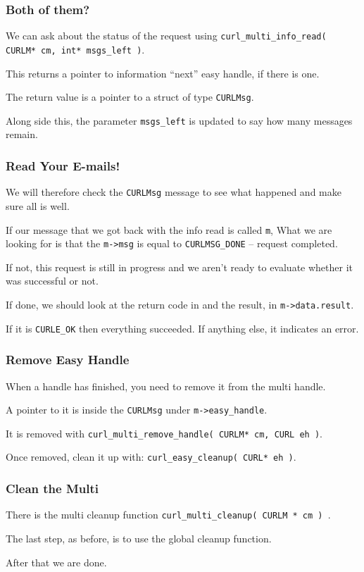 \begin{frame}
	\frametitle{Both of them?}
	We can ask about the status of the request using \texttt{curl\_multi\_info\_read( CURLM* cm, int* msgs\_left )}.

	This returns a pointer to information ``next'' easy handle, if there is one.

	The return value is a pointer to a struct of type \texttt{CURLMsg}.

	Along side this, the parameter \texttt{msgs\_left} is updated to say how many messages remain.

\end{frame}

\begin{frame}
	\frametitle{Read Your E-mails!}

	We will therefore check the \texttt{CURLMsg} message to see what happened and make sure all is well.

	If our message that we got back with the info read is called \texttt{m}, What we are looking for is that the \texttt{m->msg} is equal to \texttt{CURLMSG\_DONE} -- request completed.

	If not, this request is still in progress and we aren't ready to evaluate whether it was successful or not.

	If done, we should look at the return code in and the result, in \texttt{m->data.result}.

	If it is \texttt{CURLE\_OK} then everything succeeded. If anything else, it indicates an error.


\end{frame}

\begin{frame}
	\frametitle{Remove Easy Handle}

	When a handle has finished, you need to remove it from the multi handle.

	A pointer to it is inside the \texttt{CURLMsg} under \texttt{m->easy\_handle}.

	It is removed with \texttt{curl\_multi\_remove\_handle( CURLM* cm, CURL eh )}.

	Once removed, clean it up with: \texttt{curl\_easy\_cleanup( CURL* eh )}.


\end{frame}

\begin{frame}
	\frametitle{Clean the Multi}

	There is the multi cleanup function \texttt{curl\_multi\_cleanup( CURLM * cm ) }.

	The last step, as before, is to use the global cleanup function.

	After that we are done.


\end{frame}


